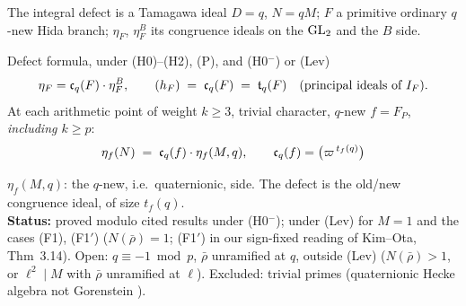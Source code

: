 \begin{frame}{The integral defect is a Tamagawa ideal}
  \small
  $D=q$, $N=qM$; $F$ a primitive ordinary $q$-new Hida branch; $\eta_F$, $\eta^B_F$ its congruence ideals on the $\mathrm{GL}_2$ and the $B$ side.
  \begin{block}{Defect formula, under (H0)--(H2), (P), and (H0$^-$) or (Lev)}
    \[\eta_F=\mathfrak c_q(F)\cdot\eta^B_F,\qquad (h_F)\;=\;\mathfrak c_q(F)\;=\;\mathfrak t_q(F)\quad\text{(principal ideals of $I_F$)}.\]
    At each arithmetic point of weight $k\ge3$, trivial character, $q$-new $f=F_P$, \emph{including $k\ge p$}:
    \[\eta_f(N)\;=\;\cc_q(f)\cdot\eta_f(M,q),\qquad \cc_q(f)=\big(\varpi^{\,t_f(q)}\big)\vspace{-2pt}\]
  \end{block}
  $\eta_f(M,q)$: the $q$-new, i.e.\ quaternionic, side. The defect is the old/new congruence ideal, of size $t_f(q)$.\\[1pt]
  {\footnotesize\textbf{Status:} proved modulo cited results under (H0$^-$); under (Lev) for $M=1$ and the cases (F1), (F1$'$) ($N(\bar\rho)=1$; (F1$'$) in our
  sign-fixed reading of Kim--Ota, Thm~3.14). Open: $q\equiv-1\bmod p$, $\bar\rho$ unramified at $q$, outside (Lev) ($N(\bar\rho)>1$, or $\ell^2\mid M$ with $\bar\rho$ unramified at $\ell$).
  Excluded: trivial primes (quaternionic Hecke algebra not Gorenstein ).}
\end{frame}
